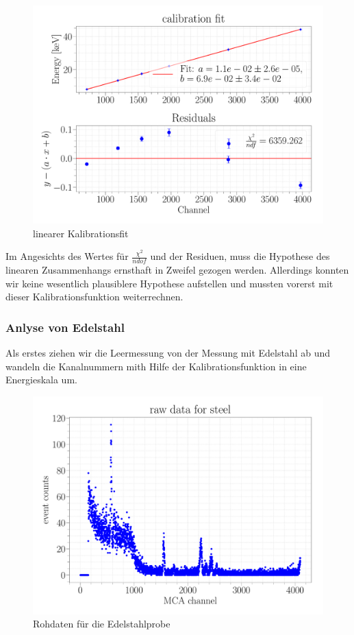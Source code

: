 \documentclass[a4paper,14pt]{article}
\begin{document}
\begin{figure}[H]
\centering
\includegraphics[scale=0.25]{../Figures/am_calibration_fit.pdf}
\caption{linearer Kalibrationsfit}
\label{am_calibration_fit}
\end{figure}

Im Angesichts des Wertes für $\frac{\chi^2}{ndof}$ und der Residuen, muss die Hypothese des linearen Zusammenhangs ernsthaft in Zweifel gezogen werden. Allerdings konnten wir keine wesentlich plausiblere Hypothese aufstellen und mussten vorerst mit dieser Kalibrationsfunktion weiterrechnen.

\subsubsection{Anlyse von Edelstahl}
Als erstes ziehen wir die Leermessung von der Messung mit Edelstahl ab und wandeln die Kanalnummern mith Hilfe der Kalibrationsfunktion in eine Energieskala um.

\begin{figure}[H]
\centering
\includegraphics[scale=0.25]{../Figures/am_fe_raw.pdf}
\caption{Rohdaten für die Edelstahlprobe}
\label{am_fe_raw}
\end{figure}
\end{document}
